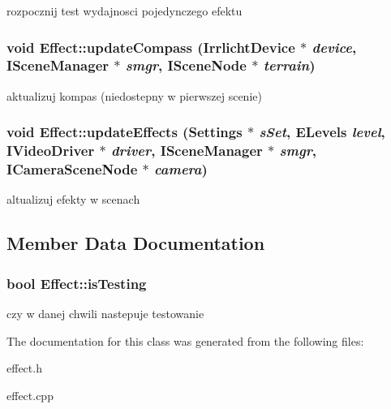 \label{class_effect_a47bc7316ae643fa6daa5d196327ec3c1}
rozpocznij test wydajnosci pojedynczego efektu \hypertarget{class_effect_a1c3d763f5bc0790784ba162c3942957d}{
\subsubsection[{updateCompass}]{\setlength{\rightskip}{0pt plus 5cm}void Effect::updateCompass (IrrlichtDevice $\ast$ {\em device}, \/  ISceneManager $\ast$ {\em smgr}, \/  ISceneNode $\ast$ {\em terrain})}}
\label{class_effect_a1c3d763f5bc0790784ba162c3942957d}
aktualizuj kompas (niedostepny w pierwszej scenie) \hypertarget{class_effect_ae3df4e1067f5ce70ab7faa70314abbc8}{
\subsubsection[{updateEffects}]{\setlength{\rightskip}{0pt plus 5cm}void Effect::updateEffects ({\bf Settings} $\ast$ {\em sSet}, \/  ELevels {\em level}, \/  IVideoDriver $\ast$ {\em driver}, \/  ISceneManager $\ast$ {\em smgr}, \/  ICameraSceneNode $\ast$ {\em camera})}}
\label{class_effect_ae3df4e1067f5ce70ab7faa70314abbc8}
altualizuj efekty w scenach 

\subsection{Member Data Documentation}
\hypertarget{class_effect_a97bca2df55a7bed5e0045d7442fe1601}{
\subsubsection[{isTesting}]{\setlength{\rightskip}{0pt plus 5cm}bool {\bf Effect::isTesting}}}
\label{class_effect_a97bca2df55a7bed5e0045d7442fe1601}
czy w danej chwili nastepuje testowanie 

The documentation for this class was generated from the following files:\begin{DoxyCompactItemize}
\item 
effect.h\item 
effect.cpp\end{DoxyCompactItemize}
